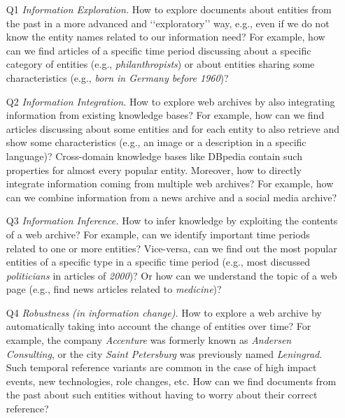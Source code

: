 \documentclass[twocolumn]{svjour3}
\newcommand{\q}[1]{\lq\lq{}{}#1\rq\rq{}{}}
\begin{document}
\begin{itemize}
\item[Q1]   {\em Information Exploration.}
            How to explore documents about entities from the past in a
            more advanced and \q{exploratory} way,
            e.g., even if we do not know the entity names
            related to our information need?
            For example, how can we find articles of a specific time period
            discussing about a specific category of entities (e.g., {\em philanthropists})
            or about entities sharing some characteristics (e.g., {\em born in Germany before 1960})?
\item[Q2]   {\em Information Integration.}
            How to explore web archives by also integrating
            information from existing kno\-wledge bases?
            For example, how can we find articles discussing about
            some entities and for each entity to also retrieve
            and show some characteristics (e.g., an image or a description in a specific language)?
            Cross-domain knowledge bases like DBpedia contain such properties for almost every popular entity.
            Moreover, how to directly integrate information coming from
            multiple web archives?
            For example, how can we combine information
            from a news archive and a social media archive?
\item[Q3]   {\em Information Inference.}
            How to infer knowledge by exploiting the contents of a web archive? For example,
            can we identify important time periods related to one or more entities?
            Vice-versa, can we find out the most popular entities of a specific type
            in a specific time period (e.g., most discussed {\em politicians} in articles of {\em 2000})?
            Or how can we understand the topic of a web page (e.g., find news articles related to {\em medicine})?
\item[Q4]   {\em Robustness (in information change).} How to explore a web archive by automatically taking into account the change
            of entities over time? For example, the company {\em Accenture} was formerly known
            as {\em Andersen Consulting}, or
            the city {\em Saint Petersburg} was previously named {\em Leningrad}.
            Such temporal reference variants are common in the case of high impact events,
            new technologies, role changes, etc. How can we find
            documents from the past about such entities without having to worry about their correct reference?

\end{itemize}
\end{document}
